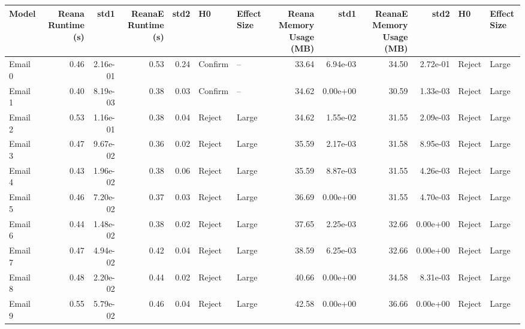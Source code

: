 \begin{tabular}{lrrrrllrrrrll}
\toprule
    Model &  Reana Runtime (s) &      std1 &  ReanaE Runtime (s) &  std2 &       H0 & Effect Size &  Reana Memory Usage (MB) &      std1 &  ReanaE Memory Usage (MB) &      std2 &      H0 & Effect Size \\
\midrule
  Email 0 &               0.46 &  2.16e-01 &                0.53 &  0.24 &  Confirm &          -- &                    33.64 &  6.94e-03 &                     34.50 &  2.72e-01 &  Reject &       Large \\
  Email 1 &               0.40 &  8.19e-03 &                0.38 &  0.03 &  Confirm &          -- &                    34.62 &  0.00e+00 &                     30.59 &  1.33e-03 &  Reject &       Large \\
  Email 2 &               0.53 &  1.16e-01 &                0.38 &  0.04 &   Reject &       Large &                    34.62 &  1.55e-02 &                     31.55 &  2.09e-03 &  Reject &       Large \\
  Email 3 &               0.47 &  9.67e-02 &                0.36 &  0.02 &   Reject &       Large &                    35.59 &  2.17e-03 &                     31.58 &  8.95e-03 &  Reject &       Large \\
  Email 4 &               0.43 &  1.96e-02 &                0.38 &  0.06 &   Reject &       Large &                    35.59 &  8.87e-03 &                     31.55 &  4.26e-03 &  Reject &       Large \\
  Email 5 &               0.46 &  7.20e-02 &                0.37 &  0.03 &   Reject &       Large &                    36.69 &  0.00e+00 &                     31.55 &  4.70e-03 &  Reject &       Large \\
  Email 6 &               0.44 &  1.48e-02 &                0.38 &  0.02 &   Reject &       Large &                    37.65 &  2.25e-03 &                     32.66 &  0.00e+00 &  Reject &       Large \\
  Email 7 &               0.47 &  4.94e-02 &                0.42 &  0.04 &   Reject &       Large &                    38.59 &  6.25e-03 &                     32.66 &  0.00e+00 &  Reject &       Large \\
  Email 8 &               0.48 &  2.20e-02 &                0.44 &  0.02 &   Reject &       Large &                    40.66 &  0.00e+00 &                     34.58 &  8.31e-03 &  Reject &       Large \\
  Email 9 &               0.55 &  5.79e-02 &                0.46 &  0.04 &   Reject &       Large &                    42.58 &  0.00e+00 &                     36.66 &  0.00e+00 &  Reject &       Large \\

\end{tabular}
